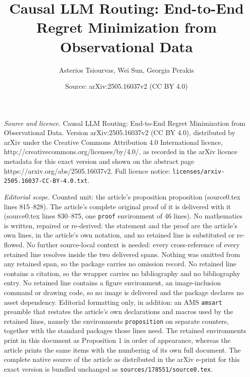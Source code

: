 \documentclass[10pt,a4paper]{amsart}
\title{Causal LLM Routing: End-to-End Regret Minimization from Observational Data}
\author{Asterios Tsiourvas, Wei Sun, Georgia Perakis}
\date{Source: arXiv:2505.16037v2 (CC BY 4.0)}
\begin{document}
\maketitle

\noindent\emph{Source and licence.} Causal LLM Routing: End-to-End Regret Minimization from Observational Data. Version arXiv:2505.16037v2 (CC BY 4.0), distributed by arXiv under the Creative Commons Attribution 4.0 International licence, http://creativecommons.org/licenses/by/4.0/, as recorded in the arXiv licence metadata for this exact version and shown on the abstract page https://arxiv.org/abs/2505.16037v2. Full licence notice: \texttt{licenses/arxiv-2505.16037-CC-BY-4.0.txt}.\par\smallskip

\noindent\textit{Editorial scope.} Counted unit: the article's proposition proposition (source0.tex lines 815--828). The article's complete original proof of it is delivered with it (source0.tex lines 830--875, one \texttt{proof} environment of 46 lines). No mathematics is written, repaired or re-derived: the statement and the proof are the article's own lines, in the article's own notation, and no retained line is substituted or re-flowed.  No further source-local context is needed: every cross-reference of every retained line resolves inside the two delivered spans.  Nothing was omitted from any retained span, so the package carries no omission record.  No retained line contains a citation, so the wrapper carries no bibliography and no bibliography entry.  No retained line contains a figure environment, an image-inclusion command or drawing code, so no image is delivered and the package declares no asset dependency.  Editorial formatting only, in addition: an AMS \texttt{amsart} preamble that restates the article's own declarations and macros used by the retained lines, namely the environments \texttt{proposition} on separate counters, together with the standard packages those lines need.  The retained environments print in this document as Proposition 1 in order of appearance, whereas the article prints the same items with the numbering of its own full document.  The complete native source of the article as distributed in the arXiv e-print for this exact version is bundled unchanged as \texttt{sources/178551/source0.tex}.
\end{document}
